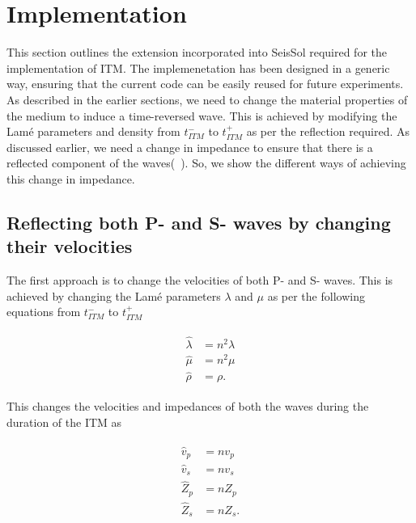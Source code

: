 \section{Implementation}

This section outlines the extension incorporated into SeisSol required for the implementation of \ac{ITM}. The implemenetation has been designed in a generic way,
ensuring that the current code can be easily reused for future experiments. \\

As described in the earlier sections, we need to change the material properties of the medium to induce a time-reversed wave. This is achieved by modifying the Lam\'{e}
parameters and density from $t_{ITM}^-$ to $t_{ITM}^+$ as per the reflection required. As discussed earlier, we need a change in impedance to ensure that there is a reflected
component of the waves(~\parencite[Sec 9.8]{leveque_2002}). So, we show the different ways of achieving this change in impedance. \\

\subsection{Reflecting both P- and S- waves by changing their velocities}

The first approach is to change the velocities of both P- and S- waves. This is achieved by changing the Lam\'{e} parameters $\lambda$ and $\mu$ as per the following equations from $t_{ITM}^-$ to $t_{ITM}^+$

\begin{align}
    \begin{split}
        \hat{\lambda} &= n^2 \lambda \\
        \hat{\mu} &= n^2 \mu \\
        \hat{\rho} &= \rho .
    \end{split}
\end{align}

This changes the velocities and impedances of both the waves during the duration of the \ac{ITM} as

\begin{align}
    \begin{split}
        \hat{v}_p &= n v_p \\
        \hat{v}_s &= n v_s \\
        \hat{Z}_p &= n Z_p \\
        \hat{Z}_s &= n Z_s .
    \end{split}
\end{align}

